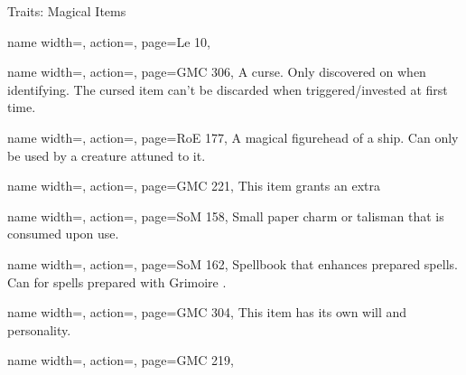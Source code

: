 \begin{PageBack}
\begin{Tables}{\backTableHeight}
\begin{Table}{Traits: Magical Items}
\begin{entry}{}{%
                name width=\conditionLength,%
                action=\Contract,
                page=Le 10,
            }
            \end{entry}
            \begin{entry}{}{%
                name width=\conditionLength,%
                action=\Cursed,
                page=GMC 306,
            }
                A curse. Only discovered on  when identifying. The cursed item can't be discarded when
                triggered/invested at first time.
            \end{entry}
            \begin{entry}{}{%
                name width=\conditionLength,%
                action=\Figurehead,
                page=RoE 177,
            }
                A magical figurehead of a ship. Can only be used by a creature attuned to it. \hfill {}
            \end{entry}
            \begin{entry}{}{%
                name width=\conditionLength,%
                action=\Focused,
                page=GMC 221,
            }
                This item grants an extra  \hfill{}
            \end{entry}
            \begin{entry}{}{%
                name width=\conditionLength,%
                action=\Fulu,
                page=SoM 158,
            }
                Small paper charm or talisman that is consumed upon use. 
            \end{entry}
            \begin{entry}{}{%
                name width=\conditionLength,%
                action=\Grimoire,
                page=SoM 162,
            }
                Spellbook that enhances prepared spells. Can  for spells prepared with Grimoire
                . \hfill{}
            \end{entry}
            \begin{entry}{}{%
                name width=\conditionLength,%
                action=\Intelligent,
                page=GMC 304,
            }
                This item has its own will and personality.
            \end{entry}
            \begin{entry}{}{%
                name width=\conditionLength,%
                action=\Invested,
                page=GMC 219,
            }

\end{entry}
\end{Table}
\end{Tables}
\end{PageBack}
